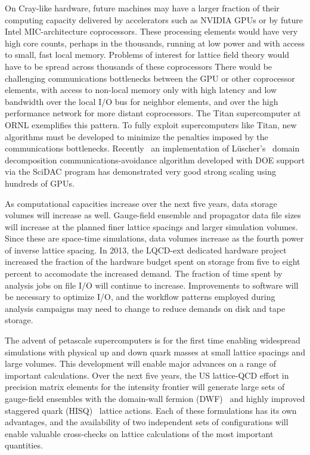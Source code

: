 On Cray-like hardware, future machines may have a larger fraction of their
computing capacity delivered by accelerators such as NVIDIA GPUs or by
future Intel MIC-architecture coprocessors.  These processing elements would
have very high core counts, perhaps in the thousands, running at low power and
with access to small, fast local memory.  Problems of interest for lattice
field theory would have to be spread across thousands of these coprocessors
There would be challenging communications bottlenecks between the GPU or
other coprocessor elements, with access to non-local memory only with high
latency and low bandwidth over the local I/O bus for neighbor elements, and
over the high performance network for more distant coprocessors.  The Titan
supercomputer at ORNL exemplifies this pattern.  To fully exploit
supercomputers like Titan, new algorithms must be developed to minimize the
penalties imposed by the communications bottlenecks.  Recently~\cite{QUDAdd}
an implementation of L\"{u}scher's~\cite{DomainDecomp} domain decomposition
communications-avoidance algorithm developed with DOE support via the SciDAC
program has demonstrated very good strong scaling using hundreds of GPUs.

As computational capacities increase over the next five years, data storage
volumes will increase as well.  Gauge-field ensemble and propagator data file
sizes will increase at the planned finer lattice spacings and larger
simulation volumes.  Since these are space-time simulations, data volumes
increase as the fourth power of inverse lattice spacing.  In 2013, the
LQCD-ext dedicated hardware project increased the fraction of the hardware
budget spent on storage from five to eight percent to accomodate the increased
demand.  The fraction of time spent by analysis jobs on file I/O will continue
to increase.  Improvements to software will be necessary to optimize I/O, and
the workflow patterns employed during analysis campaigns may need to change to
reduce demands on disk and tape storage.

The advent of petascale supercomputers is for the first time enabling
widespread simulations with physical up and down quark masses at small lattice
spacings and large volumes.  This development will enable major advances on a
range of important calculations.  Over the next five years, the US lattice-QCD
effort in precision matrix elements for the intensity frontier will generate
large sets of gauge-field ensembles with the domain-wall fermion
(DWF)~\cite{Kaplan:1992bt,Furman:1994ky,Vranas:2006zk} and highly improved
staggered quark (HISQ)~\cite{Follana:2006rc} lattice actions. Each of these
formulations has its own advantages, and the availability of two independent
sets of configurations will enable valuable cross-checks on lattice
calculations of the most important quantities.

